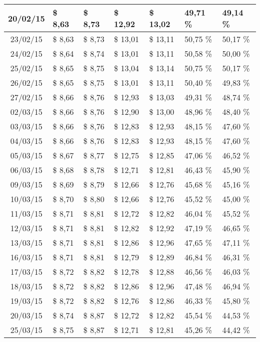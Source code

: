 \begin{center}
\begin{longtable}{|c|p{1.5cm}|p{1.5cm}|p{1.5cm}|p{1.5cm}|p{1.5cm}|p{1.5cm}|}
20/02/15 & \$ 8,63 & \$ 8,73 & \$ 12,92 & \$ 13,02 & 49,71 \% & 49,14 \% \\ \hline
23/02/15 & \$ 8,63 & \$ 8,73 & \$ 13,01 & \$ 13,11 & 50,75 \% & 50,17 \% \\ \hline
24/02/15 & \$ 8,64 & \$ 8,74 & \$ 13,01 & \$ 13,11 & 50,58 \% & 50,00 \% \\ \hline
25/02/15 & \$ 8,65 & \$ 8,75 & \$ 13,04 & \$ 13,14 & 50,75 \% & 50,17 \% \\ \hline
26/02/15 & \$ 8,65 & \$ 8,75 & \$ 13,01 & \$ 13,11 & 50,40 \% & 49,83 \% \\ \hline
27/02/15 & \$ 8,66 & \$ 8,76 & \$ 12,93 & \$ 13,03 & 49,31 \% & 48,74 \% \\ \hline
02/03/15 & \$ 8,66 & \$ 8,76 & \$ 12,90 & \$ 13,00 & 48,96 \% & 48,40 \% \\ \hline
03/03/15 & \$ 8,66 & \$ 8,76 & \$ 12,83 & \$ 12,93 & 48,15 \% & 47,60 \% \\ \hline
04/03/15 & \$ 8,66 & \$ 8,76 & \$ 12,83 & \$ 12,93 & 48,15 \% & 47,60 \% \\ \hline
05/03/15 & \$ 8,67 & \$ 8,77 & \$ 12,75 & \$ 12,85 & 47,06 \% & 46,52 \% \\ \hline
06/03/15 & \$ 8,68 & \$ 8,78 & \$ 12,71 & \$ 12,81 & 46,43 \% & 45,90 \% \\ \hline
09/03/15 & \$ 8,69 & \$ 8,79 & \$ 12,66 & \$ 12,76 & 45,68 \% & 45,16 \% \\ \hline
10/03/15 & \$ 8,70 & \$ 8,80 & \$ 12,66 & \$ 12,76 & 45,52 \% & 45,00 \% \\ \hline
11/03/15 & \$ 8,71 & \$ 8,81 & \$ 12,72 & \$ 12,82 & 46,04 \% & 45,52 \% \\ \hline
12/03/15 & \$ 8,71 & \$ 8,81 & \$ 12,82 & \$ 12,92 & 47,19 \% & 46,65 \% \\ \hline
13/03/15 & \$ 8,71 & \$ 8,81 & \$ 12,86 & \$ 12,96 & 47,65 \% & 47,11 \% \\ \hline
16/03/15 & \$ 8,71 & \$ 8,81 & \$ 12,79 & \$ 12,89 & 46,84 \% & 46,31 \% \\ \hline
17/03/15 & \$ 8,72 & \$ 8,82 & \$ 12,78 & \$ 12,88 & 46,56 \% & 46,03 \% \\ \hline
18/03/15 & \$ 8,72 & \$ 8,82 & \$ 12,86 & \$ 12,96 & 47,48 \% & 46,94 \% \\ \hline
19/03/15 & \$ 8,72 & \$ 8,82 & \$ 12,76 & \$ 12,86 & 46,33 \% & 45,80 \% \\ \hline
20/03/15 & \$ 8,74 & \$ 8,87 & \$ 12,72 & \$ 12,82 & 45,54 \% & 44,53 \% \\ \hline
25/03/15 & \$ 8,75 & \$ 8,87 & \$ 12,71 & \$ 12,81 & 45,26 \% & 44,42 \% \\ \hline

\end{longtable}
\end{center}
